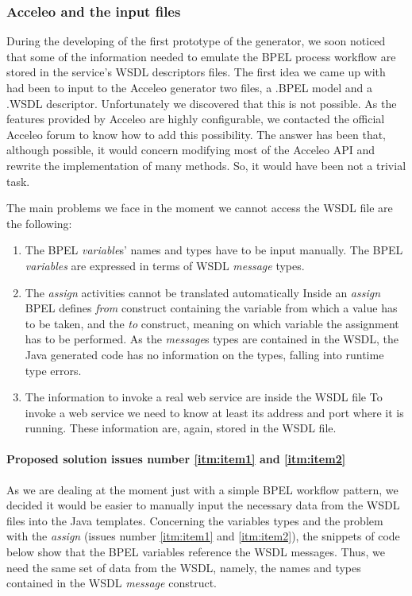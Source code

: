 \subsubsection{Acceleo and the input files}
\label{sec:IssueInputFiles}
During the developing of the first prototype of the generator, we soon noticed that some of the information needed to emulate the BPEL process workflow are stored in the service's WSDL descriptors files. 
The first idea we came up with had been to input to the Acceleo generator two files, a .BPEL model and a .WSDL descriptor. Unfortunately we discovered that this is not possible. As the features provided by Acceleo are highly configurable, we contacted the official Acceleo forum \cite{acceleoForum} to know how to add this possibility. The answer has been that, although possible, it would concern modifying most of the Acceleo API and rewrite the implementation of many methods. So, it would have been not a trivial task.

The main problems we face in the moment we cannot access the WSDL file are the following: 
\begin{enumerate}
  \item \label{itm:item1}The BPEL \textit{variable}s' names and types have to be input manually. 
    \subitem The BPEL \textit{variables} are expressed in terms of WSDL \textit{message} types.  
  \item \label{itm:item2}The \textit{assign} activities cannot be translated automatically
    \subitem Inside an \textit{assign} BPEL defines \textit{from} construct containing the variable from which a value has to be taken, and the \textit{to} construct, meaning on which variable the assignment has to be performed. As the \textit{message}s types are contained in the WSDL, the Java generated code has no information on the types, falling into runtime type errors.
  \item \label{itm:item3}The information to invoke a real web service are inside the WSDL file
    \subitem To invoke a web service we need to know at least its address and port where it is running. These information are, again, stored in the WSDL file. 
\end{enumerate}

\paragraph{Proposed solution issues number \ref{itm:item1} and \ref{itm:item2}}
As we are dealing at the moment just with a simple BPEL workflow pattern, we decided it would be easier to manually input the necessary data from the WSDL files into the Java templates.
Concerning the variables types and the problem with the \textit{assign} (issues number \ref{itm:item1} and \ref{itm:item2}), the snippets of code below show that the BPEL variables reference the WSDL messages. Thus, we need the same set of data from the WSDL, namely, the names and types contained in the WSDL \textit{message} construct. 


